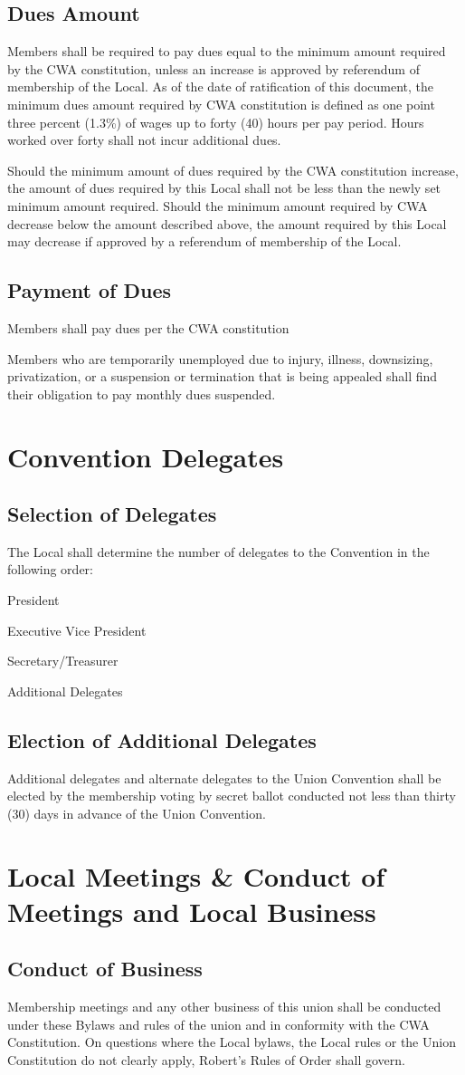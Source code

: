 \documentclass[11pt]{article}
\newcommand{\article}[1]{\vspace{.75cm}\section{#1}}
\newcommand{\articlesection}[1]{\vspace{.25cm}\subsection{#1}}
\begin{document}
\articlesection{Dues Amount}
Members shall be required to pay dues equal to the minimum amount required by the CWA constitution, unless an increase is approved by referendum of membership of the Local. As of the date of ratification of this document, the minimum dues amount required by CWA constitution is defined as one point three percent (1.3\%) of wages up to forty (40) hours per pay period. Hours worked over forty shall not incur additional dues.

Should the minimum amount of dues required by the CWA constitution increase, the amount of dues required by this Local shall not be less than the newly set minimum amount required. Should the minimum amount required by CWA decrease below the amount described above, the amount required by this Local may decrease if approved by a referendum of membership of the Local.

\articlesection{Payment of Dues}
\begin{paralist}
\item Members shall pay dues per the CWA constitution
\item Members who are temporarily unemployed due to injury, illness, downsizing, privatization, or a suspension or termination that is being appealed shall find their obligation to pay monthly dues suspended.
\end{paralist}

\article{Convention Delegates}
\articlesection{Selection of Delegates}
The Local shall determine the number of delegates to the Convention in the following order:

\begin{numberlist}
\item President
\item Executive Vice President
\item Secretary/Treasurer
\item Additional Delegates
\end{numberlist}

\articlesection{Election of Additional Delegates}
Additional delegates and alternate delegates to the Union Convention shall be elected by the membership voting by secret ballot conducted not less than thirty (30) days in advance of the Union Convention.

\article{Local Meetings \& Conduct of Meetings and Local Business}
\articlesection{Conduct of Business}
Membership meetings and any other business of this union shall be conducted under these Bylaws and rules of the union and in conformity with the CWA Constitution. On questions where the Local bylaws, the Local rules or the Union Constitution do not clearly apply, Robert's Rules of Order shall govern.
\end{document}
